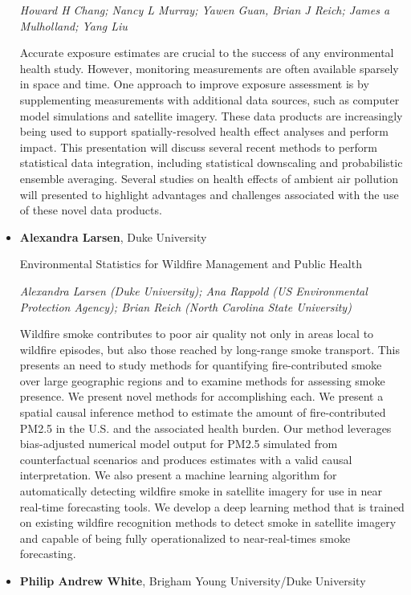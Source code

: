 \begin{itemize}
\emph{\footnotesize Howard H Chang; Nancy L Murray; Yawen Guan, Brian J Reich; James a Mulholland;  Yang Liu}

Accurate exposure estimates are crucial to the success of any environmental health study. However, monitoring measurements are often available sparsely in space and time. One approach to improve exposure assessment is by supplementing measurements with additional data sources, such as computer model simulations and satellite imagery. These data products are increasingly being used to support spatially-resolved health effect analyses and perform impact.  This presentation will discuss several recent methods to perform statistical data integration, including statistical downscaling and probabilistic ensemble averaging. Several studies on health effects of ambient air pollution will presented to highlight advantages and challenges associated with the use of these novel data products.

\item \textbf{Alexandra Larsen}, Duke University

Environmental Statistics for Wildfire Management and Public Health

\emph{\footnotesize Alexandra Larsen (Duke University); Ana Rappold (US Environmental Protection Agency); Brian Reich (North Carolina State University)}

Wildfire smoke contributes to poor air quality not only in areas local to wildfire episodes, but also those reached by long-range smoke transport. This presents an need to study methods for quantifying fire-contributed smoke over large geographic regions and to examine methods for assessing smoke presence. We present novel methods for accomplishing each. We present a spatial causal inference method to estimate the amount of fire-contributed PM2.5 in the U.S. and the associated health burden. Our method leverages bias-adjusted numerical model output for PM2.5 simulated from counterfactual scenarios and produces estimates with a valid causal interpretation. We also present a machine learning algorithm for automatically detecting wildfire smoke in satellite imagery for use in near real-time forecasting tools. We develop a deep learning method that is trained on existing wildfire recognition methods to detect smoke in satellite imagery and capable of being fully operationalized to near-real-times smoke forecasting.

\item \textbf{Philip Andrew White}, Brigham Young University/Duke University


\end{itemize}
